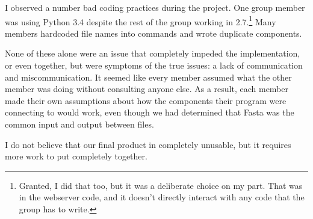 \documentclass[10pt,letterpaper]{article}
\begin{document}
I observed a number bad coding practices during the project.
One group member was using Python 3.4 despite the rest of the group working in 2.7.\footnote{Granted, I did that too, but it was a deliberate choice on my part.  That was in the webserver code, and it doesn't directly interact with any code that the group has to write.}
Many members hardcoded file names into commands and wrote duplicate components.


None of these alone were an issue that completely impeded the implementation, or even together, but were symptoms of the true issues:   a lack of communication and miscommunication.
It seemed like every member assumed what the other member was doing without consulting anyone else.
As a result, each member made their own assumptions about how the components their program were connecting to would work, even though we had determined that Fasta was the common input and output between files.


I do not believe that our final product in completely unusable, but it requires more work to put completely together.



\end{document}
